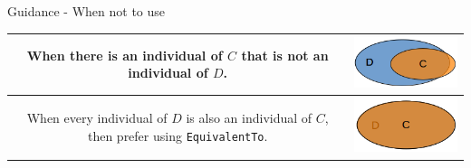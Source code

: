 \documentclass{beamer}
\begin{document}
{\begin{block}{Guidance - When not to use}
\begin{table}
\begin{center}
\begin{small}
\begin{tabular}{|c|c|}
						\hline 
						\begin{minipage}{6cm}
							When there is an individual of $C$ that is not an individual of $D$.
						\end{minipage}									
						& 
						\begin{minipage}{4cm}
							\includegraphics[trim = 0mm 1mm 0mm 1mm, clip, scale=0.4]{../../SubClassOf vs EquivalentTo/images/SubClassOfWhenNotToUse.png}
						\end{minipage}										
						\\
						\hline 
						\begin{minipage}{6cm}
							When every individual of $D$ is also an individual of $C$, then prefer using \texttt{EquivalentTo}.
						\end{minipage}									
						& 
						\begin{minipage}{4cm}
							\includegraphics[trim = 0mm 1mm 0mm 1mm, clip, scale=0.4]{../../SubClassOf vs EquivalentTo/images/EquivalentTo.png}
						\end{minipage}										
						\\					
						\hline						 				  
					\end{tabular}
				\end{small}
			\end{center}
		\end{table}
	\end{block}
}
\end{document}
